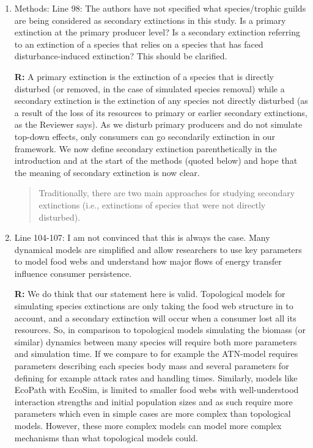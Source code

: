 \documentclass[12pt]{article}
\begin{document}
\begin{enumerate}
            \item Methods: Line 98: The authors have not specified what species/trophic guilds are being considered as secondary extinctions in this study. Is a primary extinction at the primary producer level? Is a secondary extinction referring to an extinction of a species that relies on a species that has faced disturbance-induced extinction? This should be clarified.

                \textbf{R:} A primary extinction is the extinction of a species that is directly disturbed (or removed, in the case of simulated species removal) while a secondary extinction is the extinction of any species not directly disturbed (as a result of the loss of its resources to primary or earlier secondary extinctions, as the Reviewer says). As we disturb primary producers and do not simulate top-down effects, only consumers can go secondarily extinction in our framework. We now define secondary extinction parenthetically in the introduction and at the start of the methods (quoted below) and hope that the meaning of secondary extinction is now clear.

                \begin{quotation} 
                Traditionally, there are two main approaches for studying secondary extinctions (i.e., extinctions of species that were not directly disturbed). 
                \end{quotation}

            \item Line 104-107: I am not convinced that this is always the case. Many dynamical models are simplified and allow researchers to use key parameters to model food webs and understand how major flows of energy transfer influence consumer persistence.

                \textbf{R:} We do think that our statement here is valid. Topological models for simulating species extinctions are only taking the food web structure in to account, and a secondary extinction will occur when a consumer lost all its resources. So, in comparison to topological models simulating the biomass (or similar) dynamics between many species will require both more parameters and simulation time. If we compare to for example the ATN-model requires parameters describing each species body mass and several parameters for defining for example attack rates and handling times. Similarly, models like EcoPath with EcoSim, is limited to smaller food webs with well-understood interaction strengths and initial population sizes and as such require more parameters which even in simple cases are more complex than topological models. However, these more complex models can model more complex mechanisms than what topological models could.
                

\end{enumerate}
\end{document}

